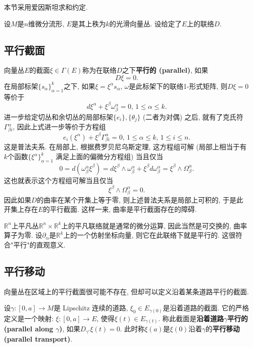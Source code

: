 
本节采用爱因斯坦求和约定.

设$M$是$n$维微分流形, $E$是其上秩为$k$的光滑向量丛. 设给定了$E$上的联络$D$.

\subsection{平行截面}

向量丛$E$的截面$\xi\in\Gamma(E)$称为在联络$D$之下\textbf{平行的 (parallel)}, 如果
$$D\xi=0.$$
在局部标架$\{s_\alpha\}_{\alpha=1}^k$之下, 如果$\xi=\xi^\alpha s_\alpha$, $\omega$是此标架下的联络1-形式矩阵, 则$D\xi=0$等价于
$$
d\xi^\alpha+\xi^\beta\omega^\alpha_\beta=0,\,1\leq \alpha\leq k.
$$
进一步给定切丛和余切丛的局部标架$\{e_i\},\{\theta_j\}$ (二者为对偶) 之后, 就有了克氏符$\Gamma_{\beta i}^\alpha$, 因此上式进一步等价于方程组
$$
e_i(\xi^\alpha)+\xi^\beta\Gamma^\alpha_{\beta i}=0,\,1\leq \alpha\leq k,\,1\leq i\leq n.
$$
这是普法夫系. 在局部上, 根据费罗贝尼乌斯定理, 这方程组可解 (局部上相当于有$k$个函数$\{\xi^\alpha\}_{\alpha=1}^k$ 满足上面的偏微分方程组) 当且仅当
$$
0=d(\omega^\alpha_\beta\xi^\beta)=d\xi^\beta\wedge\omega^\alpha_\beta+\xi^\beta d\omega^\alpha_\beta=\xi^\beta\wedge\Omega_\beta^\alpha.
$$
这也就表示这个方程组可解当且仅当
$$
\xi^\beta\wedge\Omega_\beta^\alpha=0.
$$
因此如果$D$的曲率在某个开集上等于零, 则上述普法夫系是局部上可积的, 于是此开集上存在$E$的平行截面. 这样一来, 曲率是平行截面存在的障碍.

$\mathbb{R}^n$上平凡丛$\mathbb{R}^n\times\mathbb{R}^k$上的平凡联络就是通常的微分运算, 因此当然是可交换的, 曲率算子为零. 设$\partial_\alpha$是$\mathbb{R}^k$上的一个仿射坐标向量, 则它在此联络下就是平行的. 这很符合"平行"的直观意义. 

\subsection{平行移动}
向量丛在区域上的平行截面很可能不存在, 但却可以定义沿着某条道路平行的截面. 

设$\gamma:[0,a]\to M$是 Lipschitz 连续的道路, $\xi_0\in E_{\gamma(0)}$是沿着道路的截面. 它的严格定义是一个映射: $\xi:[0,a]\to E$, 使得$\xi(t)\in E_{\gamma(t)}$. 称此截面是\textbf{沿着道路$\gamma$平行的 (parallel along $\gamma$)}, 如果$D_{\gamma'}\xi(t)=0$. 此时称$\xi(a)$是$\xi(0)$沿着$\gamma$的\textbf{平行移动 (parallel transport)}. 

